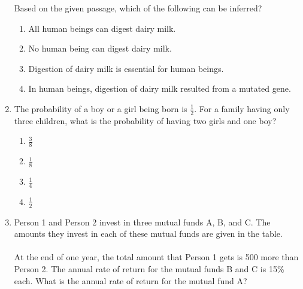 \documentclass[journal,12pt,onecolumn]{IEEEtran}
\newcommand{\rupee}{\text{Rs.}}
\theoremstyle{remark}
\begin{document}
\begin{enumerate}
Based on the given passage, which of the following can be inferred?
\begin{enumerate}
    \item All human beings can digest dairy milk.
    \item No human being can digest dairy milk.
    \item Digestion of dairy milk is essential for human beings.
    \item In human beings, digestion of dairy milk resulted from a mutated gene.
\end{enumerate}
\item The probability of a boy or a girl being born is $ \frac{1}{2} $. For a family having only three children, what is the probability of having two girls and one boy?
\begin{enumerate}
    \item $ \frac{3}{8} $
    \item $ \frac{1}{8} $
    \item $ \frac{1}{4} $
    \item $ \frac{1}{2} $
\end{enumerate}
\item Person 1 and Person 2 invest in three mutual funds A, B, and C. The amounts they invest in each of these mutual funds are given in the table.\\
	\\
At the end of one year, the total amount that Person 1 gets is \rupee500 more than Person 2. The annual rate of return for the mutual funds B and C is 15\% each. What is the annual rate of return for the mutual fund A?


\end{enumerate}
\end{document}
